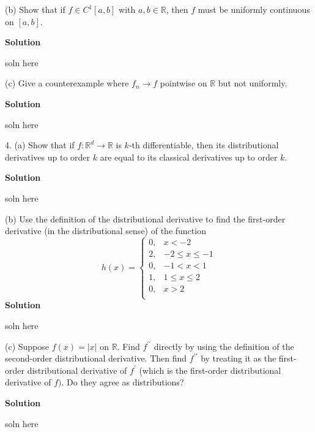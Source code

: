 \documentclass{article}
\begin{document}
\vspace{5mm}

(b) Show that if $f \in C^{1}[a, b]$ with $a, b \in \mathbb{R}$, then
$f$ must be uniformly continuous on $[a, b]$.

\textbf{Solution}

soln here

\vspace{5mm}

(c) Give a counterexample where $f_n \rightarrow f$ pointwise on
$\mathbb{R}$ but not uniformly.

\textbf{Solution}

soln here

\vspace{5mm}

4. (a) Show that if $f : \mathbb{R}^{d} \rightarrow \mathbb{R}$ is
$k$-th differentiable, then its distributional derivatives up to order
$k$ are equal to its classical derivatives up to order $k$.

\textbf{Solution}

soln here

\vspace{5mm}

(b) Use the definition of the distributional derivative to find the
first-order derivative (in the distributional sense) of the function
%
\begin{equation*}
    h(x) =
        \begin{cases}
            0, & x < -2 \\
            2, & -2 \leq x \leq -1 \\
            0, & -1 < x < 1 \\
            1, & 1 \leq x \leq 2 \\
            0, & x > 2 \\
        \end{cases}
\end{equation*}
%
\textbf{Solution}

soln here

\vspace{5mm}

(c) Suppose $f(x) = |x|$ on $\mathbb{R}$. Find $f^{\prime \prime}$
directly by using the definition of the second-order distributional
derivative. Then find $f^{\prime \prime}$ by treating it as the
first-order distributional derivative of $f^{\prime}$ (which is the
first-order distributional derivative of $f)$. Do they agree as
distributions?

\textbf{Solution}

soln here
\end{document}
